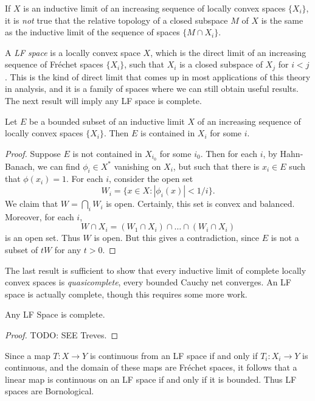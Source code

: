\begin{remark}
    If $X$ is an inductive limit of an increasing sequence of locally convex spaces $\{ X_i \}$, it is \emph{not} true that the relative topology of a closed subspace $M$ of $X$ is the same as the inductive limit of the sequence of spaces $\{ M \cap X_i \}$.
\end{remark}

A \emph{LF space} is a locally convex space $X$, which is the direct limit of an increasing sequence of Fr\'{e}chet spaces $\{ X_i \}$, such that $X_i$ is a closed subspace of $X_j$ for $i < j$. This is the kind of direct limit that comes up in most applications of this theory in analysis, and it is a family of spaces where we can still obtain useful results. The next result will imply any LF space is complete.

\begin{lemma}
    Let $E$ be a bounded subset of an inductive limit $X$ of an increasing sequence of locally convex spaces $\{ X_i \}$. Then $E$ is contained in $X_i$ for some $i$.
\end{lemma}
\begin{proof}
    Suppose $E$ is not contained in $X_{i_0}$ for some $i_0$. Then for each $i$, by Hahn-Banach, we can find $\phi_i \in X^*$ vanishing on $X_i$, but such that there is $x_i \in E$ such that $\phi(x_i) = 1$. For each $i$, consider the open set
    \[ W_i = \{ x \in X : |\phi_i(x)| < 1/i \}. \]
    We claim that $W = \bigcap_i W_i$ is open. Certainly, this set is convex and balanced. Moreover, for each $i$,
    \[ W \cap X_i = (W_1 \cap X_i) \cap \dots \cap (W_i \cap X_i) \]
    is an open set. Thus $W$ is open. But this gives a contradiction, since $E$ is not a subset of $tW$ for any $t > 0$.
\end{proof}

The last result is sufficient to show that every inductive limit of complete locally convex spaces is \emph{quasicomplete}, every bounded Cauchy net converges. An LF space is actually complete, though this requires some more work.

\begin{theorem}
    Any LF Space is complete.
\end{theorem}
\begin{proof}
    TODO: SEE Treves.
\end{proof}

Since a map $T: X \to Y$ is continuous from an LF space if and only if $T_i: X_i \to Y$ is continuous, and the domain of these maps are Fr\'{e}chet spaces, it follows that a linear map is continuous on an LF space if and only if it is bounded. Thus LF spaces are Bornological.

